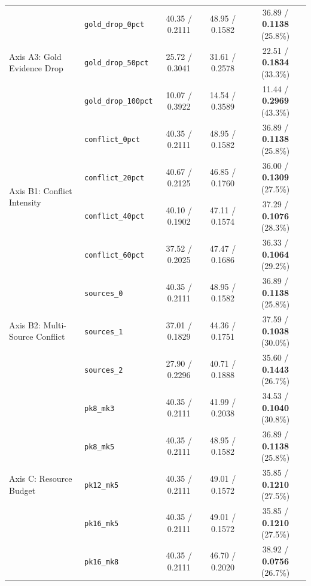 \documentclass[11pt]{article}
\begin{document}
\begin{table}[t]
{{\begin{tabular}{llccc}
\midrule
\multirow{3}{*}{Axis A3: Gold Evidence Drop}
& \texttt{gold\_drop\_0pct} & 40.35 / 0.2111 & 48.95 / 0.1582 & 36.89 / \textbf{0.1138} (25.8\%) \\
& \texttt{gold\_drop\_50pct} & 25.72 / 0.3041 & 31.61 / 0.2578 & 22.51 / \textbf{0.1834} (33.3\%) \\
& \texttt{gold\_drop\_100pct} & 10.07 / 0.3922 & 14.54 / 0.3589 & 11.44 / \textbf{0.2969} (43.3\%) \\
\midrule
\multirow{4}{*}{Axis B1: Conflict Intensity}
& \texttt{conflict\_0pct} & 40.35 / 0.2111 & 48.95 / 0.1582 & 36.89 / \textbf{0.1138} (25.8\%) \\
& \texttt{conflict\_20pct} & 40.67 / 0.2125 & 46.85 / 0.1760 & 36.00 / \textbf{0.1309} (27.5\%) \\
& \texttt{conflict\_40pct} & 40.10 / 0.1902 & 47.11 / 0.1574 & 37.29 / \textbf{0.1076} (28.3\%) \\
& \texttt{conflict\_60pct} & 37.52 / 0.2025 & 47.47 / 0.1686 & 36.33 / \textbf{0.1064} (29.2\%) \\
\midrule
\multirow{3}{*}{Axis B2: Multi-Source Conflict}
& \texttt{sources\_0} & 40.35 / 0.2111 & 48.95 / 0.1582 & 36.89 / \textbf{0.1138} (25.8\%) \\
& \texttt{sources\_1} & 37.01 / 0.1829 & 44.36 / 0.1751 & 37.59 / \textbf{0.1038} (30.0\%) \\
& \texttt{sources\_2} & 27.90 / 0.2296 & 40.71 / 0.1888 & 35.60 / \textbf{0.1443} (26.7\%) \\
\midrule
\multirow{5}{*}{Axis C: Resource Budget}
& \texttt{pk8\_mk3} & 40.35 / 0.2111 & 41.99 / 0.2038 & 34.53 / \textbf{0.1040} (30.8\%) \\
& \texttt{pk8\_mk5} & 40.35 / 0.2111 & 48.95 / 0.1582 & 36.89 / \textbf{0.1138} (25.8\%) \\
& \texttt{pk12\_mk5} & 40.35 / 0.2111 & 49.01 / 0.1572 & 35.85 / \textbf{0.1210} (27.5\%) \\
& \texttt{pk16\_mk5} & 40.35 / 0.2111 & 49.01 / 0.1572 & 35.85 / \textbf{0.1210} (27.5\%) \\
& \texttt{pk16\_mk8} & 40.35 / 0.2111 & 46.70 / 0.2020 & 38.92 / \textbf{0.0756} (26.7\%) \\
\bottomrule
\end{tabular}
}}
\end{table}
\end{document}
